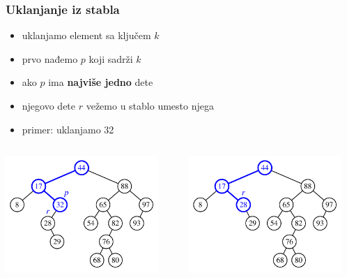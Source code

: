 \documentclass[compress,aspectratio=169]{beamer}
\begin{document}
\begin{frame}[fragile]
  \frametitle{Uklanjanje iz stabla}
  \begin{itemize}
    \item uklanjamo element sa ključem $k$
    \item prvo nađemo $p$ koji sadrži $k$
    \item ako $p$ ima \textbf{najviše jedno} dete
    \item njegovo dete $r$ vežemo u stablo umesto njega
    \item primer: uklanjamo 32
  \end{itemize}
  \begin{columns}
    \begin{column}[c]{6cm}
      \begin{center}
        \includegraphics[width=5.8cm]{asp-11-pic06a.pdf}
      \end{center}
    \end{column}  
    \begin{column}[c]{6cm}
      \begin{center}
        \includegraphics[width=5.8cm]{asp-11-pic06b.pdf}
      \end{center}
    \end{column}  
  \end{columns}
\end{frame}
\end{document}
